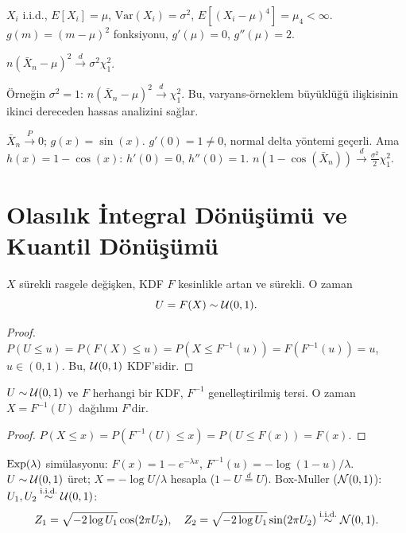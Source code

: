 \begin{ornek}
$X_i$ i.i.d., $E[X_i] = \mu$, $\mathrm{Var}(X_i) = \sigma^2$, $E[(X_i-\mu)^4] = \mu_4 < \infty$.
$g(m) = (m - \mu)^2$ fonksiyonu, $g'(\mu) = 0$, $g''(\mu) = 2$.

$n(\bar{X}_n - \mu)^2 \xrightarrow{d} \sigma^2 \chi^2_1$.

Örneğin $\sigma^2 = 1$: $n(\bar{X}_n-\mu)^2 \xrightarrow{d} \chi^2_1$.
Bu, varyans-örneklem büyüklüğü ilişkisinin ikinci dereceden hassas analizini sağlar.
\end{ornek}

\begin{ornek}
$\bar{X}_n \xrightarrow{P} 0$; $g(x) = \sin(x)$. $g'(0) = 1 \neq 0$, normal delta yöntemi geçerli.
Ama $h(x) = 1 - \cos(x)$: $h'(0) = 0$, $h''(0) = 1$.
$n(1 - \cos(\bar{X}_n)) \xrightarrow{d} \frac{\sigma^2}{2}\chi^2_1$.
\end{ornek}

\section{Olasılık İntegral Dönüşümü ve Kuantil Dönüşümü}
\label{sec:prob_integral}

\begin{teorem}\label{thm:oid}
$X$ sürekli rasgele değişken, KDF $F$ kesinlikle artan ve sürekli. O zaman
\[
  U = F(X) \sim \mathcal{U}(0,1).
\]
\end{teorem}

\begin{proof}
$P(U \leq u) = P(F(X)\leq u) = P(X\leq F^{-1}(u)) = F(F^{-1}(u)) = u$, $u\in(0,1)$. Bu, $\mathcal{U}(0,1)$ KDF'sidir.
\end{proof}

\begin{teorem}\label{thm:kuantil}
$U\sim\mathcal{U}(0,1)$ ve $F$ herhangi bir KDF, $F^{-1}$ genelleştirilmiş tersi. O zaman $X=F^{-1}(U)$ dağılımı $F$'dir.
\end{teorem}

\begin{proof}
$P(X\leq x)=P(F^{-1}(U)\leq x)=P(U\leq F(x))=F(x)$.
\end{proof}

\begin{ornek}\label{ex:simulasyon}
$\operatorname{Exp}(\lambda)$ simülasyonu: $F(x)=1-e^{-\lambda x}$, $F^{-1}(u)=-\log(1-u)/\lambda$. $U\sim\mathcal{U}(0,1)$ üret; $X=-\log U/\lambda$ hesapla ($1-U\overset{d}{=}U$).
Box-Muller ($\mathcal{N}(0,1)$): $U_1,U_2\overset{\text{i.i.d.}}{\sim}\mathcal{U}(0,1)$:
\[
  Z_1=\sqrt{-2\log U_1}\cos(2\pi U_2),\quad Z_2=\sqrt{-2\log U_1}\sin(2\pi U_2)\overset{\text{i.i.d.}}{\sim}\mathcal{N}(0,1).
\]
\end{ornek}


